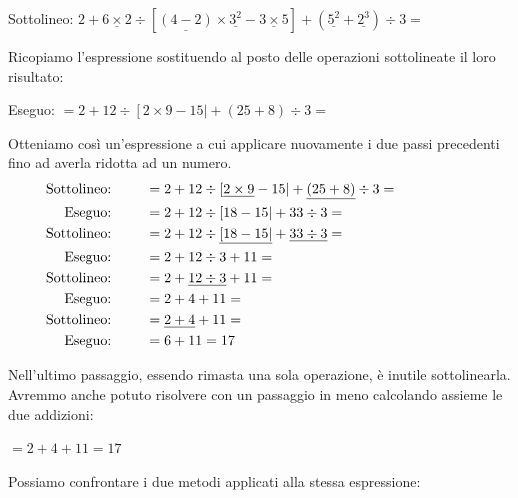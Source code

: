 \noindent Sottolineo: \hspace{28mm} \(2 + 
 \underline{6 \times 2} \div \left[ \underline{\left(4 -2 \right)} 
   \times \underline{3^{2}} - 
   \underline{3 \times 5} \right] +
 \left( \underline{5^{2}} + \underline{2^{3}} \right) \div 3 =\)

Ricopiamo l'espressione sostituendo al posto delle operazioni 
sottolineate il loro risultato:

\noindent Eseguo: \hspace{28.7mm} \(= 2 + 
 12 \div \left[ 2 \times 9 - 15 \right| +
 \left( 25 + 8 \right) \div 3 =\)

Otteniamo così un'espressione a cui applicare nuovamente i due passi 
precedenti fino ad averla ridotta ad un numero.
\begin{align*}
\text{Sottolineo: } \qquad &= 2 + 
 12 \div \left[ \underline{2 \times 9} - 15 \right| +
 \underline{\left( 25 + 8 \right)} \div 3 = \hspace{20mm}\\ 
\text{Eseguo: } \qquad &= 2 + 12 \div \left[ 18 - 15 \right| +
 33 \div 3 =\\ 
\text{Sottolineo: } \qquad &= 2 + 
 12 \div \underline{\left[ 18 - 15 \right|} +
 \underline{33 \div 3} = \\ 
\text{Eseguo: } \qquad &= 2 + 
 12 \div 3 +
 11 = \\ 
\text{Sottolineo: } \qquad &= 2 + 
 \underline{12 \div 3} +
 11 = \\ 
\text{Eseguo: } \qquad &= 2 + 
 4 +
 11 = \\ 
\text{Sottolineo: } \qquad &= \underline{2 +  4} + 11 = \\ 
\text{Eseguo: } \qquad &= 6 + 11 = 17
\end{align*}

Nell'ultimo passaggio, essendo rimasta una sola operazione, è inutile 
sottolinearla. Avremmo anche potuto risolvere con un passaggio in meno
calcolando assieme le due addizioni:

\(= 2 + 4 + 11 = 17\)

\begin{esempio}{}{}
Possiamo confrontare i due metodi applicati alla stessa espressione:

\vspace{2mm}
\end{esempio}


